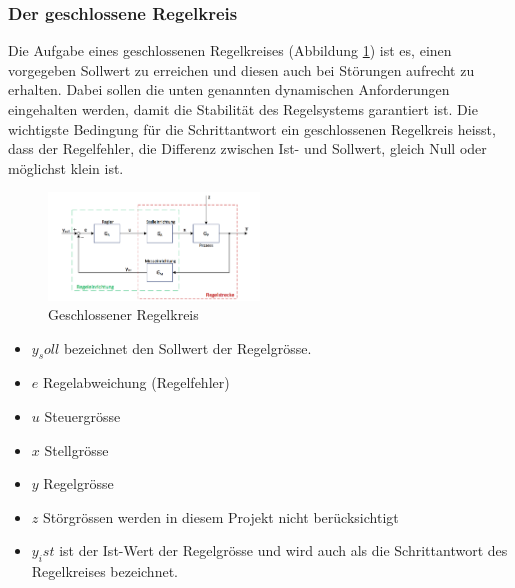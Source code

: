 \subsubsection{Der geschlossene Regelkreis}
Die Aufgabe eines geschlossenen Regelkreises (Abbildung \ref{fig:geschlossenerRegelkreis}) ist es, einen vorgegeben Sollwert zu erreichen und diesen
auch bei St\"orungen aufrecht zu erhalten. Dabei sollen die unten genannten
dynamischen Anforderungen eingehalten werden, damit die Stabilit\"at des
Regelsystems garantiert ist. Die wichtigste Bedingung f\"ur die Schrittantwort
ein geschlossenen Regelkreis heisst, dass der Regelfehler, die Differenz
zwischen Ist- und Sollwert, gleich Null oder m\"oglichst klein ist.\\


\begin{figure}[!h!, width=\pagewidth]
\begin{center}
\includegraphics[width=0.5\textwidth]{images/geschlRegelkreis}
\caption{Geschlossener Regelkreis}
\label{fig:geschlossenerRegelkreis}
\end{center}
\end{figure}

\begin{itemize}
\item
$y_soll$ bezeichnet den Sollwert der Regelgr\"osse.
\item
$e$ Regelabweichung (Regelfehler)
\item
$u$ Steuergr\"osse
\item
$x$ Stellgr\"osse
\item
$y$ Regelgr\"osse
\item
$z$ St\"orgr\"ossen werden in diesem Projekt nicht berücksichtigt
\item
$y_ist$ ist der Ist-Wert der Regelgr\"osse und wird auch als die
Schrittantwort des Regelkreises bezeichnet.
\end{itemize}


